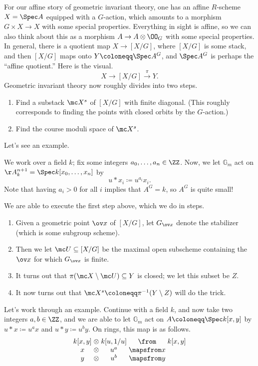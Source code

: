 \documentclass{article}
\begin{document}
For our affine story of geometric invariant theory, one has an affine $R$-scheme $X=\Spec A$ equipped with a $G$-action, which amounts to a morphism $G\times X\to X$ with some special properties. Everything in sight is affine, so we can also think about this as a morphism $A\to A\otimes\OO_G$ with some special properties. In general, there is a quotient map $X\to [X/G]$, where $[X/G]$ is some stack, and then $[X/G]$ maps onto $Y\coloneqq\Spec A^G$, and $\Spec A^G$ is perhaps the ``affine quotient.'' Here is the visual.
\[X\to[X/G]\stackrel\pi\to Y.\]
Geometric invariant theory now roughly divides into two steps.
\begin{enumerate}
    \item Find a substack $\mc X^s$ of $[X/G]$ with finite diagonal. (This roughly corresponds to finding the points with closed orbits by the $G$-action.)
    \item Find the course moduli space of $\mc X^s$.
\end{enumerate}
Let's see an example.
\begin{example}
    We work over a field $k$; fix some integers $a_0,\ldots,a_n\in\ZZ$. Now, we let $\mathbb G_m$ act on $\AA_k^{n+1}=\Spec k[x_0,\ldots,x_n]$ by
    \[u*x_i\coloneqq u^{a_i}x_i.\]
    Note that having $a_i>0$ for all $i$ implies that $A^G=k$, so $A^G$ is quite small!
\end{example}
We are able to execute the first step above, which we do in steps.
\begin{enumerate}
    \item Given a geometric point $\ov x$ of $[X/G]$, let $G_{\ov x}$ denote the stabilizer (which is some subgroup scheme).
    \item Then we let $\mc U\subseteq[X/G]$ be the maximal open subscheme containing the $\ov x$ for which $G_{\ov x}$ is finite.
    \item It turns out that $\pi(\mc X\setminus\mc U)\subseteq Y$ is closed; we let this subset be $Z$.
    \item It now turns out that $\mc X^s\coloneqq\pi^{-1}(Y\setminus Z)$ will do the trick.
\end{enumerate}
Let's work through an example. Continue with a field $k$, and now take two integers $a,b\in\ZZ$, and we are able to let $\mathbb G_m$ act on $A\coloneqq\Spec k[x,y]$ by $u*x\coloneqq u^ax$ and $u*y\coloneqq u^by$. On rings, this map is as follows.
\[\arraycolsep=1.4pt\begin{array}{cccccc}
    k[x,y] &\otimes& k[u,1/u] &\from& k[x,y] \\
    x &\otimes& u^a &\mapsfrom x \\
    y &\otimes& u^b &\mapsfrom y
\end{array}\]
\end{document}
